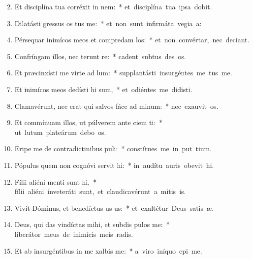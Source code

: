 \begin{flushleft}
\begin{enumerate}[leftmargin=*]
\setcounter{enumi}{1}

\item Et disciplína tua corréxit  in nem:~* \mbox{et disciplína tua ipsa  dobit.}
\item Dilatásti gressus os tus me:~* \mbox{et non sunt infirmáta vegia a:}
\item Pérsequar inimícos meos et compredam los:~* \mbox{et non convértar, nec deciant.}
\item Confríngam illos, nec terunt re:~* \mbox{cadent subtus des os.}
\item Et præcinxísti me virte ad lum:~* \mbox{supplantásti insurgéntes  me tus me.}
\item Et inimícos meos dedísti hi sum,~* \mbox{et odiéntes me didisti.}
\item Clamavérunt, nec erat qui salvos fáce ad minum:~* \mbox{nec exauvit os.}
\item Et commínuam illos, ut púlverem ante ciem ti:~* \mbox{ut lutum plateárum debo os.}
\item Eripe me de contradictinibus puli:~* \mbox{constítues me in put tium.}
\item Pópulus quem non cognóvi servit hi:~* \mbox{in audítu auris obevit hi.}
\item Fílii aliéni menti sunt hi,~* \mbox{fílii aliéni inveteráti sunt, et claudicavérunt a mitis is.}
\item Vivit Dóminus, et benedíctus us us:~* \mbox{et exaltétur Deus satis æ.}
\item Deus, qui das vindíctas mihi, et subdis pulos  me:~* \mbox{liberátor meus de inimícis meis radis.}
\item Et ab insurgéntibus in me xalbis me:~* \mbox{a viro iníquo epi me.}

\end{enumerate}
\end{flushleft}

